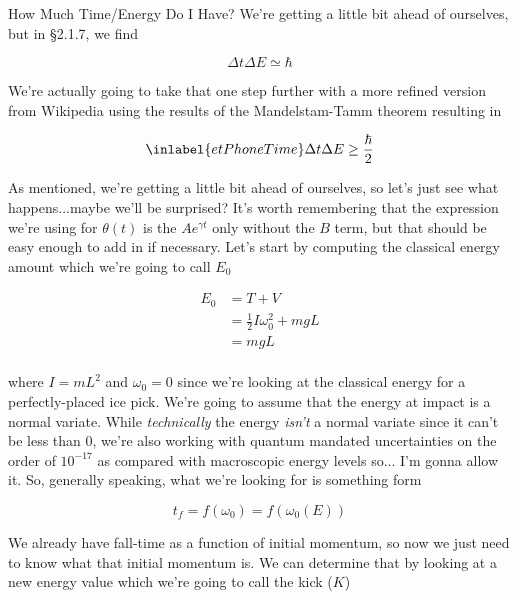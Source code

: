 \begin{answer}
\begin{answerpart}{How Much Time/Energy Do I Have?}
    We're getting a little bit ahead of ourselves, but in \S2.1.7, we
    find
    
    \begin{equation}
      \tag{2.74}
      \Delta t \Delta E \simeq \hbar
    \end{equation}

    We're actually going to take that one step further with a more
    refined version from Wikipedia using the results of the
    Mandelstam-Tamm theorem resulting in

    \begin{equation}
      \inlabel{etPhoneTime}
      \Delta t \Delta E \ge \frac{\hbar}{2}
    \end{equation}

    As mentioned, we're getting a little bit ahead of ourselves, so
    let's just see what happens...maybe we'll be surprised?  It's
    worth remembering that the expression we're using for $\theta(t)$
    is the $Ae^{\gamma t}$ only without the $B$ term, but that should
    be easy enough to add in if necessary.  Let's start by computing
    the classical energy amount which we're going to call $E_0$

    \begin{equation}
      \begin{split}
        E_0 &= T + V\\
        &= \frac{1}{2}I\omega_0^2 + mgL\\
        &= mgL\\
      \end{split}
    \end{equation}

    where $I = mL^2$ and $\omega_0 = 0$ since we're looking at the
    classical energy for a perfectly-placed ice pick.  We're going to
    assume that the energy at impact is a normal variate.  While
    \emph{technically} the energy \emph{isn't} a normal variate since
    it can't be less than $0$, we're also working with quantum
    mandated uncertainties on the order of $10^{-17}$ as compared with
    macroscopic energy levels so... I'm gonna allow it.  So, generally
    speaking, what we're looking for is something form

    \begin{equation}
      t_f = f(\omega_0) = f(\omega_0(E))
    \end{equation}

    We already have fall-time as a function of initial momentum, so
    now we just need to know what that initial momentum is.  We can
    determine that by looking at a new energy value which we're going
    to call the kick ($K$)


\end{answerpart}
\end{answer}
